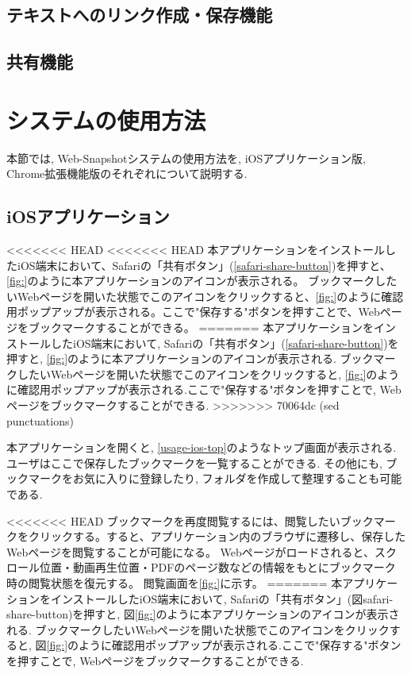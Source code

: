 \subsection{テキストへのリンク作成・保存機能}
\subsection{共有機能}

\section{システムの使用方法}
本節では, Web-Snapshotシステムの使用方法を, iOSアプリケーション版, Chrome拡張機能版のそれぞれについて説明する.

\subsection{iOSアプリケーション}
<<<<<<< HEAD
<<<<<<< HEAD
本アプリケーションをインストールしたiOS端末において、Safariの「共有ボタン」(\ref{safari-share-button})を押すと、\ref{fig:}のように本アプリケーションのアイコンが表示される。
ブックマークしたいWebページを開いた状態でこのアイコンをクリックすると、\ref{fig:}のように確認用ポップアップが表示される。ここで"保存する"ボタンを押すことで、Webページをブックマークすることができる。
=======
本アプリケーションをインストールしたiOS端末において, Safariの「共有ボタン」(\ref{safari-share-button})を押すと, \ref{fig:}のように本アプリケーションのアイコンが表示される.
ブックマークしたいWebページを開いた状態でこのアイコンをクリックすると, \ref{fig:}のように確認用ポップアップが表示される.ここで"保存する"ボタンを押すことで, Webページをブックマークすることができる.
>>>>>>> 70064dc (sed punctuations)

本アプリケーションを開くと, \ref{usage-ios-top}のようなトップ画面が表示される.ユーザはここで保存したブックマークを一覧することができる.
その他にも, ブックマークをお気に入りに登録したり, フォルダを作成して整理することも可能である.

<<<<<<< HEAD
ブックマークを再度閲覧するには、閲覧したいブックマークをクリックする。すると、アプリケーション内のブラウザに遷移し、保存したWebページを閲覧することが可能になる。
Webページがロードされると、スクロール位置・動画再生位置・PDFのページ数などの情報をもとにブックマーク時の閲覧状態を復元する。
閲覧画面を\ref{fig:}に示す。
=======
本アプリケーションをインストールしたiOS端末において, Safariの「共有ボタン」(図{safari-share-button})を押すと, 図\ref{fig:}のように本アプリケーションのアイコンが表示される.
ブックマークしたいWebページを開いた状態でこのアイコンをクリックすると, 図\ref{fig:}のように確認用ポップアップが表示される.ここで"保存する"ボタンを押すことで, Webページをブックマークすることができる.

